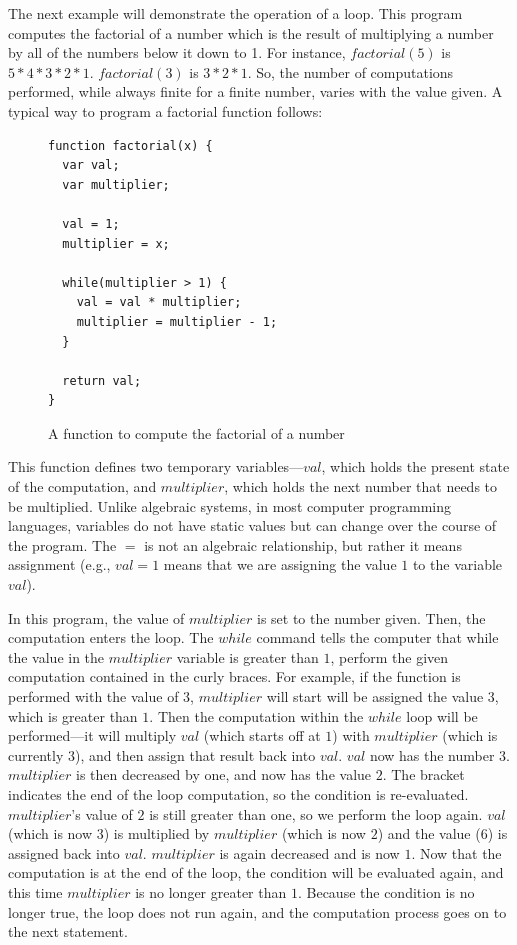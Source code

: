 The next example will demonstrate the operation of a loop.  This program computes the factorial of a number which is the result of multiplying a number by all of the numbers below it down to 1.  For instance, $factorial(5)$ is $5 * 4 * 3 * 2 * 1$.  $factorial(3)$ is $3 * 2 * 1$.  So, the number of computations performed, while always finite for a finite number, varies with the value given.  A typical way to program a factorial function follows:

\begin{figure}[H]
\begin{mdframed}
\begin{verbatim}
function factorial(x) {
  var val;
  var multiplier;

  val = 1;
  multiplier = x;

  while(multiplier > 1) {
    val = val * multiplier;
    multiplier = multiplier - 1;
  }

  return val;
}
\end{verbatim}
\end{mdframed}
\caption{A function to compute the factorial of a number}
\end{figure}

This function defines two temporary variables---$val$, which holds the present state of the computation, and $multiplier$, which holds the next number that needs to be multiplied.  Unlike algebraic systems, in most computer programming languages, variables do not have static values but can change over the course of the program.  The $=$ is not an algebraic relationship, but rather it means assignment (e.g.,  $val = 1$ means that we are assigning the value $1$ to the variable $val$).  

In this program, the value of $multiplier$ is set to the number given.  Then, the computation enters the loop.  The $while$ command tells the computer that while the value in the $multiplier$ variable is greater than $1$, perform the given computation contained in the curly braces.  For example, if the function is performed with the value of $3$, $multiplier$ will start will be assigned the value $3$, which is greater than $1$.  Then the computation within the $while$ loop will be performed---it will multiply $val$ (which starts off at $1$) with $multiplier$ (which is currently $3$), and then assign that result back into $val$.  $val$ now has the number $3$.  $multiplier$ is then decreased by one, and now has the value $2$.  The bracket indicates the end of the loop computation, so the condition is re-evaluated.  $multiplier$'s value of $2$ is still greater than one, so we perform the loop again.  $val$ (which is now $3$) is multiplied by $multiplier$ (which is now $2$) and the value ($6$) is assigned back into $val$.  $multiplier$ is again decreased and is now $1$.  Now that the computation is at the end of the loop, the condition will be evaluated again, and this time $multiplier$ is no longer greater than $1$.  Because the condition is no longer true, the loop does not run again, and the computation process goes on to the next statement.  

